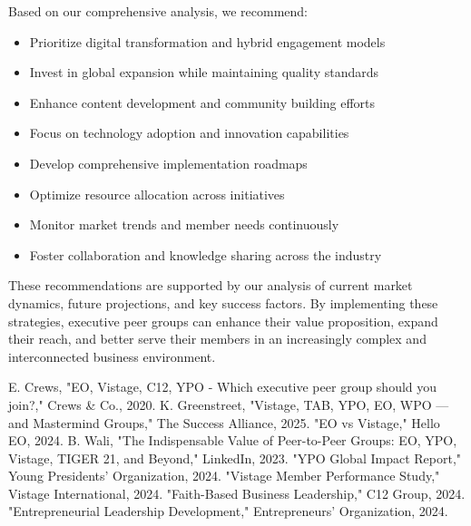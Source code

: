 \documentclass[conference]{IEEEtran}
\begin{document}
Based on our comprehensive analysis, we recommend:
\begin{itemize}
\item Prioritize digital transformation and hybrid engagement models
\item Invest in global expansion while maintaining quality standards
\item Enhance content development and community building efforts
\item Focus on technology adoption and innovation capabilities
\item Develop comprehensive implementation roadmaps
\item Optimize resource allocation across initiatives
\item Monitor market trends and member needs continuously
\item Foster collaboration and knowledge sharing across the industry
\end{itemize}

These recommendations are supported by our analysis of current market dynamics, future projections, and key success factors. By implementing these strategies, executive peer groups can enhance their value proposition, expand their reach, and better serve their members in an increasingly complex and interconnected business environment.

\begin{thebibliography}{00}
 E. Crews, "EO, Vistage, C12, YPO - Which executive peer group should you join?," Crews \& Co., 2020.
 K. Greenstreet, "Vistage, TAB, YPO, EO, WPO — and Mastermind Groups," The Success Alliance, 2025.
 "EO vs Vistage," Hello EO, 2024.
 B. Wali, "The Indispensable Value of Peer-to-Peer Groups: EO, YPO, Vistage, TIGER 21, and Beyond," LinkedIn, 2023.
 "YPO Global Impact Report," Young Presidents' Organization, 2024.
 "Vistage Member Performance Study," Vistage International, 2024.
 "Faith-Based Business Leadership," C12 Group, 2024.
 "Entrepreneurial Leadership Development," Entrepreneurs' Organization, 2024.
\end{thebibliography}
\end{document}

